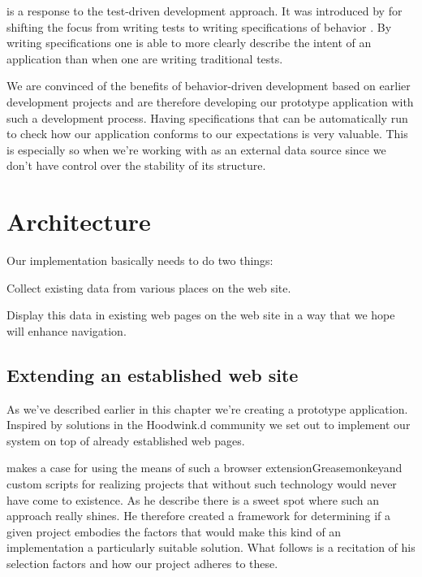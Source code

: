  is a response to the test-driven
development approach. It was introduced by \citeauthor{north06} for shifting
the focus from writing tests to writing specifications of behavior
\citep{north06}. By writing specifications one is able to
more clearly describe the intent of an application than when one
are writing traditional tests.

We are convinced of the benefits of behavior-driven development based on
earlier development projects and are therefore developing our
prototype application with such a development process. Having specifications
that can be automatically run to check how our application conforms to our
expectations is very valuable. This is especially so when we're working
with \urort{} as an external data source since we don't have control over
the stability of its structure.

\section{Architecture}
\label{section:implementation.architecture}

Our implementation basically needs to do two things:

\begin{enum}
  \item Collect existing data from various places on the \urort{} web site.
  \item Display this data in existing web pages on the \urort{} web site in
    a way that we hope will enhance navigation.
\end{enum}

\subsection{Extending an established web site}

As we've described earlier in this chapter we're creating a prototype
application. Inspired by solutions in the Hoodwink.d community we set
out to implement our system on top of already established web pages.

\citet{laird07} makes a case for using the means of such a browser
extension\dash{}Greasemonkey\dash{}and custom scripts for
realizing projects that without such technology would
never have come to existence. As he describe there is a sweet spot where such
an approach really shines. He therefore created a framework for determining
if a given project embodies the factors that would make this kind of an
implementation a particularly suitable solution. What follows is a recitation
of his selection factors and how our project adheres to these.

